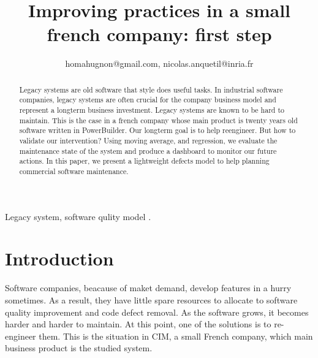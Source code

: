 \documentclass[10pt,conference]{IEEEtran}
\begin{document}
	
	\title{Improving practices in a small french  company: first step}
	
	\author{
	homahugnon@gmail.com, nicolas.anquetil@inria.fr}
	
	
	\maketitle
	
	\begin{abstract}
	Legacy systems are old software that style does useful tasks.
	In industrial software companies, legacy systems are often crucial for the company business model and represent a longterm business investment.
	Legacy systems are known to be hard to maintain.
	This is the case in a french company whose main product is twenty years old software written in PowerBuilder.
	Our longterm goal is to help reengineer.
	But how to validate our intervention?
	Using moving average, and regression, we evaluate the maintenance state of the system and produce a dashboard to monitor our future actions.
	 In this paper, we present a lightweight defects model to help planning commercial software maintenance.
	\end{abstract}
	
	\begin{IEEEkeywords}
	Legacy system, software qulity model .
	\end{IEEEkeywords}
	
	\section{Introduction}
	Software companies, beacause of maket demand, develop features  in a hurry sometimes.
	As a result, they have little spare resources to allocate to software quality improvement and code defect removal.
	As the software grows,  it becomes harder and harder to maintain.
	At this point, one of the solutions is to re-engineer them. 
	This is the situation in CIM, a small French company, which main business product  is the studied system.
	
\end{document}
